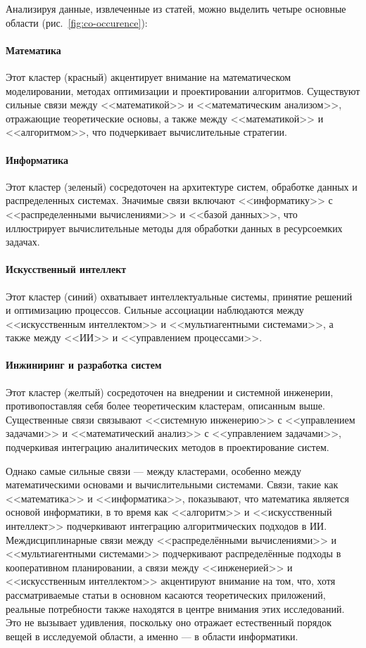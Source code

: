 Анализируя данные, извлеченные из статей, можно выделить четыре основные области (рис.~\ref{fig:co-occurence}):

\paragraph{Математика}

Этот кластер (красный) акцентирует внимание на математическом моделировании, методах оптимизации и проектировании алгоритмов.
Существуют сильные связи между <<математикой>> и <<математическим анализом>>,
отражающие теоретические основы, а также между <<математикой>> и <<алгоритмом>>, что подчеркивает вычислительные стратегии.

\paragraph{Информатика}

Этот кластер (зеленый) сосредоточен на архитектуре систем, обработке данных и распределенных системах.
Значимые связи включают <<информатику>> с <<распределенными вычислениями>> и <<базой данных>>,
что иллюстрирует вычислительные методы для обработки данных в ресурсоемких задачах.

\paragraph{Искусственный интеллект}

Этот кластер (синий) охватывает интеллектуальные системы, принятие решений и оптимизацию процессов.
Сильные ассоциации наблюдаются между <<искусственным интеллектом>> и <<мультиагентными системами>>,
а также между <<ИИ>> и <<управлением процессами>>.

\paragraph{Инжиниринг и разработка систем}

Этот кластер (желтый) сосредоточен на внедрении и системной инженерии,
противопоставляя себя более теоретическим кластерам, описанным выше.
Существенные связи связывают <<системную инженерию>> с <<управлением задачами>> и <<математический анализ>> с <<управлением задачами>>,
подчеркивая интеграцию аналитических методов в проектирование систем.

Однако самые сильные связи --- между кластерами, особенно между математическими основами и вычислительными системами.
Связи, такие как <<математика>> и <<информатика>>, показывают, что математика является основой информатики,
в то время как <<алгоритм>> и <<искусственный интеллект>> подчеркивают интеграцию алгоритмических подходов в ИИ.
Междисциплинарные связи между <<распределёнными вычислениями>> и <<мультиагентными системами>> подчеркивают распределённые подходы в кооперативном планировании,
а связи между <<инженерией>> и <<искусственным интеллектом>> акцентируют внимание на том,
что, хотя рассматриваемые статьи в основном касаются теоретических приложений,
реальные потребности также находятся в центре внимания этих исследований.
Это не вызывает удивления,
поскольку оно отражает естественный порядок вещей в исследуемой области,
а именно — в области информатики.

